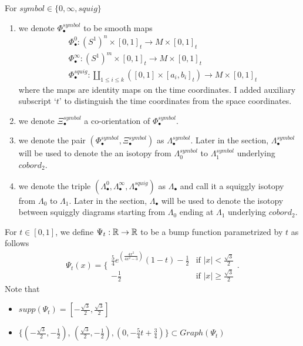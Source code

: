 \begin{definition}
For $symbol\in\{0,\infty, squig \}$
\begin{enumerate}
\item we denote $\Phi_\bullet^{symbol}$ to be smooth maps
\begin{align*}
&\Phi_\bullet^0 : (S^1)^n \times [0,1]_t \rightarrow M \times [0,1]_t \\
&\Phi_\bullet^\infty : (S^1)^m \times [0,1]_t \rightarrow M \times [0,1]_t \\
&\Phi_\bullet^{squig} : \coprod_{1\leq i \leq k} ([0,1] \times [a_i,b_i]_t) \rightarrow M \times [0,1]_t
\end{align*}
where the maps are identity maps on the time coordinates. I added auxiliary subscript `$t$' to distinguish the time coordinates from the space coordinates.

\item we denote $\Xi_\bullet^{symbol}$ a co-orientation of $\Phi_\bullet^{symbol}$.

\item we denote the pair $(\Phi_\bullet^{symbol},\Xi_\bullet^{symbol})$ as $\Lambda_\bullet^{symbol}$. Later in the section, $\Lambda_\bullet^{symbol}$ will be used to denote the an isotopy from $\Lambda_0^{symbol}$ to $\Lambda_1^{symbol}$ underlying $cobord_2$.

\item we denote the triple $(\Lambda_\bullet^{0},\Lambda_\bullet^{\infty},\Lambda_\bullet^{squig})$ as $\Lambda_\bullet$ and call it a squiggly isotopy from $\Lambda_0$ to $\Lambda_1$. Later in the section, $\Lambda_\bullet$ will be used to denote the isotopy between squiggly diagrams starting from $\Lambda_0$ ending at $\Lambda_1$ underlying $cobord_2$.
\end{enumerate}
\end{definition}

\begin{definition}
For $t \in [0,1]$, we define $\Psi_t: \mathbb{R} \rightarrow \mathbb{R}$ to be a bump function parametrized by $t$ as follows
\[\Psi_t(x)=\bigg\{
\begin{array}{ll}
    \frac{5}{4}e^{(\frac{4x^2}{4x^2 - 3})}(1-t) - \frac{1}{2} & \text{if } |x| < \frac{\sqrt{3}}{2} \\
    -\frac{1}{2} & \text{if } |x| \geq \frac{\sqrt{3}}{2} 
\end{array}
\bigg.
\]
Note that 
\begin{itemize}
\item $supp(\Psi_t) = [-\frac{\sqrt{3}}{2},\frac{\sqrt{3}}{2}]$

\item $\{(-\frac{\sqrt{3}}{2},-\frac{1}{2})$, $(\frac{\sqrt{3}}{2},-\frac{1}{2}),(0,-\frac{5}{4}t + \frac{3}{4})\} \subset Graph(\Psi_t)$
\end{itemize}
\end{definition}


